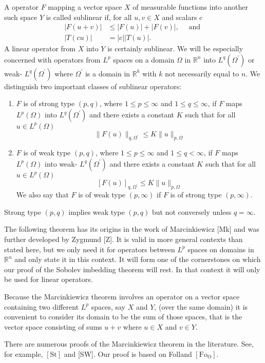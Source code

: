 \begin{para}
  A operator $F$ mapping a vector space $X$ of measurable functions into another such space $Y$ is called sublinear if, for all $u, v \in X$ and scalars $c$
  \[
  \begin{aligned}
  |F(u+v)| & \leq|F(u)|+|F(v)|, \quad \text { and } \\
  |T(c u)| & =|c||T(u)| .
  \end{aligned}
  \]
  A linear operator from $X$ into $Y$ is certainly sublinear. We will be especially concerned with operators from $L^p$ spaces on a domain $\Omega$ in $\mathbb{R}^n$ into $L^q\left(\Omega^{\prime}\right)$ or weak- $L^q\left(\Omega^{\prime}\right)$ where $\Omega^{\prime}$ is a domain in $\mathbb{R}^k$ with $k$ not necessarily equal to $n$.
  We distinguish two important classes of sublinear operators:
  \begin{enumerate}[label = (\alph*)]
    \item $F$ is of strong type $(p, q)$, where $1 \leq p \leq \infty$ and $1 \leq q \leq \infty$, if $F$ maps $L^p(\Omega)$ into $L^q\left(\Omega^{\prime}\right)$ and there exists a constant $K$ such that for all $u \in L^p(\Omega)$
    \[
    \|F(u)\|_{q, \Omega^{\prime}} \leq K\|u\|_{p, \Omega}
    \]
    \item $F$ is of weak type $(p, q)$, where $1 \leq p \leq \infty$ and $1 \leq q<\infty$, if $F$ maps $L^p(\Omega)$ into weak- $L^q\left(\Omega^{\prime}\right)$ and there exists a constant $K$ such that for all $u \in L^p(\Omega)$
    \[
    [F(u)]_{q, \Omega^{\prime}} \leq K\|u\|_{p, \Omega}
    \]
    We also say that $F$ is of weak type $(p, \infty)$ if $F$ is of strong type $(p, \infty)$.
  \end{enumerate}
  Strong type $(p, q)$ implies weak type $(p, q)$ but not conversely unless $q=\infty$.
\end{para}

\begin{para}
  The following theorem has its origins in the work of Marcinkiewicz [Mk] and was further developed by Zygmund [Z]. It is valid in more general contexts than stated here, but we only need it for operators between $L^p$ spaces on domains in $\mathbb{R}^n$ and only state it in this context. It will form one of the cornerstones on which our proof of the Sobolev imbedding theorem will rest. In that context it will only be used for linear operators.
  
  Because the Marcinkiewicz theorem involves an operator on a vector space containing two different $L^p$ spaces, say $X$ and $Y$, (over the same domain) it is convenient to consider its domain to be the sum of those spaces, that is the vector space consisting of sums $u+v$ where $u \in X$ and $v \in Y$.

  There are numerous proofs of the Marcinkiewicz theorem in the literature. See, for example, $[\mathrm{St}]$ and [SW]. Our proof is based on Folland $\left[\mathrm{Fo}_{\mathrm{O}}\right]$.
\end{para}


